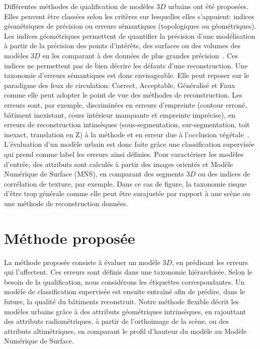 \documentclass[a4paper,french]{article}
\begin{document}
    Différentes méthodes de qualification de modèles $3D$ urbains ont été proposées. Elles peuvent être classées selon les critères sur lesquelles elles s'appuient: indices géométriques de précision ou erreurs sémantiques (topologiques ou géométriques). Les indices géométriques permettent de quantifier la précision d'une modélisation à partir de la précision des points d'intérêts, des surfaces ou des volumes des modèles $3D$ en les comparant à des données de plus grandes précision~\cite{Zeng2014}. Ces indices ne permettent pas de bien décrire les défauts d'une reconstruction. Une taxonomie d'erreurs sémantiques est donc envisageable. Elle peut reposer sur le paradigme des feux de circulation: Correct, Acceptable, Généralisé et Faux~\cite{Boudet2006} comme elle peut adopter le point de vue des méthodes de reconstruction. Les erreurs sont, par exemple, discriminées en erreurs d'empreinte (contour erroné, bâtiment inexistant, cours intérieur manquante et empreinte imprécise), en erreurs de reconstruction intinsèques (sous-segmentation, sur-segmentation, toit inexact, translation en Z) à la méthode et en erreur due à l'occlusion végétale~\cite{Michelin2013}. L'évaluation d'un modèle urbain est donc faite grâce une classification supervisée qui prend comme label les erreurs ainsi définies. Pour caractériser les modèles d'entrée, des attributs sont calculés à partir des images orientés et Modèle Numérique de Surface (MNS), en comparant des segments $3D$ ou des indices de corrélation de texture, par exemple. Dans ce cas de figure, la taxonomie risque d'être trop générale comme elle peut être surajustée par rapport à une scène ou une méthode de reconstruction données.

    \section{Méthode proposée}

    La méthode proposée consiste à évaluer un modèle $3D$, en prédisant les erreurs qui l'affectent. Ces erreurs sont définis dans une taxonomie hiérarchisée. Selon le besoin de la qualification, nous considérons les étiquettes correspondantes. Un modèle de classification supervisée est ensuite entraîné afin de prédire, dans le future, la qualité du bâtiments reconstruit. Notre méthode flexible décrit les modèles urbains grâce à des attributs géométriques intrinsèques, en rajouttant des attributs radiométriques, à partir de l'orthoimage de la scène, ou des attributs altimétriques, en comparant le profil d'hauteur du modèle au Modèle Numérique de Surface.
\end{document}
